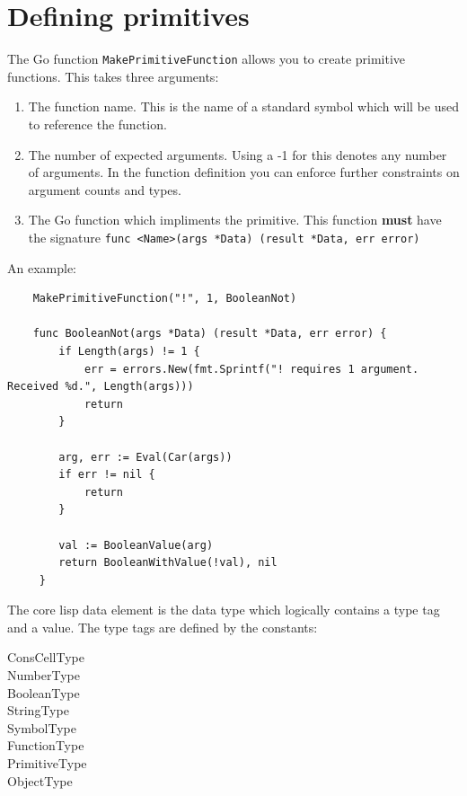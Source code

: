 \documentclass[12pt]{article}
\begin{document}
\section{Defining primitives}

The Go function \verb|MakePrimitiveFunction| allows you to create primitive functions. This takes three arguments:

\begin{enumerate}
\item The function name. This is the name of a standard symbol which will be used to reference the function.
\item The number of expected arguments. Using a -1 for this denotes any number of arguments. In the function definition you can enforce further constraints on argument counts and types.
\item The Go function which impliments the primitive. This function {\bf must} have the signature \verb|func <Name>(args *Data) (result *Data, err error)|
\end{enumerate}

\noindent An example:

\begin{verbatim}
    MakePrimitiveFunction("!", 1, BooleanNot)

    func BooleanNot(args *Data) (result *Data, err error) {
        if Length(args) != 1 {
            err = errors.New(fmt.Sprintf("! requires 1 argument. Received %d.", Length(args)))
            return
        }

        arg, err := Eval(Car(args))
        if err != nil {
            return
        }

        val := BooleanValue(arg)
        return BooleanWithValue(!val), nil
     }
\end{verbatim}

\noindent The core lisp data element is the data type which logically contains a type tag and a value. The type tags are defined by the constants:

\begin{description}
\item[ConsCellType] 
\item[NumberType]
\item[BooleanType]
\item[StringType]
\item[SymbolType]
\item[FunctionType]
\item[PrimitiveType]
\item[ObjectType]
\end{description}
\end{document}

